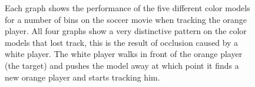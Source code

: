 \documentclass[11pt]{article}
\begin{document}
\begin{figure}
{\label{fig:3d}
}
\caption{Each graph shows the performance of the five different color models
for a number of bins on the soccer movie when tracking the orange player. All
four graphs show a very distinctive pattern on the color models that lost
track, this is the result of occlusion caused by a white player. The white
player walks in front of the orange player (the target) and pushes the model
away at which point it finds a new orange player and starts tracking him.}
\label{fig:soccer}
\end{figure}

\begin{figure}
\centering
{}
\\
\end{figure}
\end{document}
